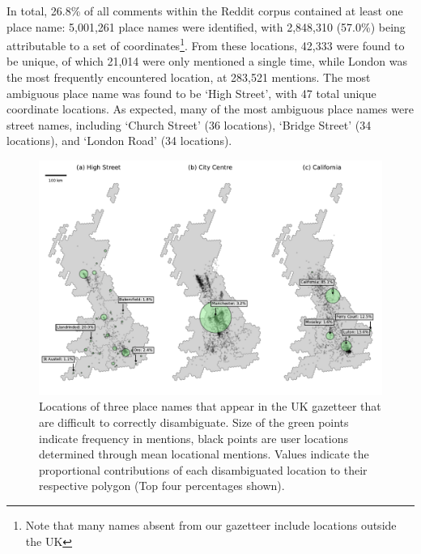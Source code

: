 \documentclass[
  letterpaper,
  11pt,
  english,
  onehalfspacing,
  headsepline]{MastersDoctoralThesis}
\begin{document}
In total, 26.8\% of all comments within the Reddit corpus contained at
least one place name: 5,001,261 place names were identified, with
2,848,310 (57.0\%) being attributable to a set of
coordinates\footnote{Note that many names absent from our gazetteer
  include locations outside the UK}. From these locations, 42,333 were
found to be unique, of which 21,014 were only mentioned a single time,
while London was the most frequently encountered location, at 283,521
mentions. The most ambiguous place name was found to be `High Street',
with 47 total unique coordinate locations. As expected, many of the most
ambiguous place names were street names, including `Church Street' (36
locations), `Bridge Street' (34 locations), and `London Road' (34
locations).

\begin{figure}

{\centering \includegraphics{04_connections/04_figures/fig-noise-output-1.pdf}

}

\caption{\label{fig-noise}Locations of three place names that appear in
the UK gazetteer that are difficult to correctly disambiguate. Size of
the green points indicate frequency in mentions, black points are user
locations determined through mean locational mentions. Values indicate
the proportional contributions of each disambiguated location to their
respective polygon (Top four percentages shown).}

\end{figure}
\end{document}
